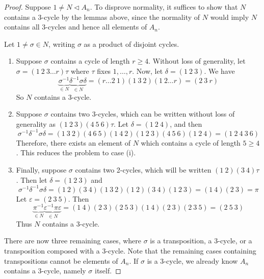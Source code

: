 \begin{proof}
	Suppose \( 1 \neq N \vartriangleleft A_n \).
	To disprove normality, it suffices to show that \( N \) contains a 3-cycle by the lemmas above, since the normality of \( N \) would imply \( N \) contains all 3-cycles and hence all elements of \( A_n \).

	Let \( 1 \neq \sigma \in N \), writing \( \sigma \) as a product of disjoint cycles.
	\begin{enumerate}
		\item Suppose \( \sigma \) contains a cycle of length \( r \geq 4 \).
		      Without loss of generality, let \( \sigma = (1\ 2\ 3\dots r) \tau \) where \( \tau \) fixes \( 1, \dots, r \).
		      Now, let \( \delta = (1\ 2\ 3) \).
		      We have
		      \[
			      \underbrace{\sigma^{-1}}_{\in N} \underbrace{\delta^{-1} \sigma \delta}_{\in N} = (r \dots 2\ 1)(1\ 3\ 2)(1\ 2\dots r) = (2\ 3\ r)
		      \]
		      So \( N \) contains a 3-cycle.
		\item Suppose \( \sigma \) contains two 3-cycles, which can be written without loss of generality as \( (1\ 2\ 3)(4\ 5\ 6) \tau \).
		      Let \( \delta = (1\ 2\ 4) \), and then
		      \[
			      \sigma^{-1} \delta^{-1} \sigma \delta = (1\ 3\ 2)(4\ 6\ 5)(1\ 4\ 2)(1\ 2\ 3)(4\ 5\ 6)(1\ 2\ 4) = (1\ 2\ 4\ 3\ 6)
		      \]
		      Therefore, there exists an element of \( N \) which contains a cycle of length \( 5 \geq 4 \).
		      This reduces the problem to case (i).
		\item Finally, suppose \( \sigma \) contains two 2-cycles, which will be written \( (1\ 2)(3\ 4)\tau \).
		      Then let \( \delta = (1\ 2\ 3) \) and
		      \[
			      \sigma^{-1} \delta^{-1} \sigma \delta = (1\ 2)(3\ 4)(1\ 3\ 2)(1\ 2)(3\ 4)(1\ 2\ 3) = (1\ 4)(2\ 3) = \pi
		      \]
		      Let \( \varepsilon = (2\ 3\ 5) \).
		      Then
		      \[
			      \underbrace{\pi^{-1}}_{\in N} \underbrace{\varepsilon^{-1} \pi \varepsilon}_{\in N} = (1\ 4)(2\ 3)(2\ 5\ 3)(1\ 4)(2\ 3)(2\ 3\ 5) = (2\ 5\ 3)
		      \]
		      Thus \( N \) contains a 3-cycle.
	\end{enumerate}
	There are now three remaining cases, where \( \sigma \) is a transposition, a 3-cycle, or a transposition composed with a 3-cycle.
	Note that the remaining cases containing transpositions cannot be elements of \( A_n \).
	If \( \sigma \) is a 3-cycle, we already know \( A_n \) contains a 3-cycle, namely \( \sigma \) itself.
\end{proof}
